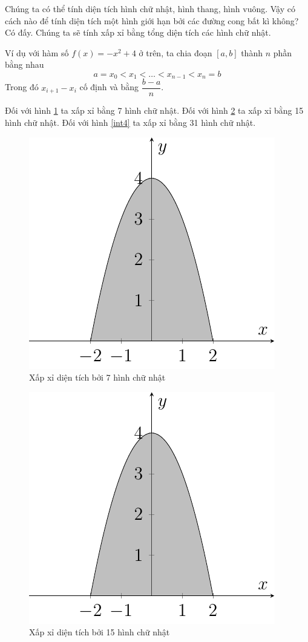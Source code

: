 Chúng ta có thể tính diện tích hình chữ nhật, hình thang, hình vuông. Vậy có cách nào để tính diện tích một hình giới hạn bởi các đường cong bất kì không? Có đấy. Chúng ta sẽ tính xấp xỉ bằng tổng diện tích các hình chữ nhật.

Ví dụ với hàm số $f(x) = -x^2 + 4$ ở trên, ta chia đoạn $[a, b]$ thành $n$ phần bằng nhau \[a = x_0 < x_1 < \ldots < x_{n-1} < x_n = b\]
Trong đó $x_{i+1} - x_i$ cố định và bằng $\dfrac{b-a}{n}$.

Đối với hình \ref{int2} ta xấp xỉ bằng 7 hình chữ nhật. Đối với hình \ref{int3} ta xấp xỉ bằng 15 hình chữ nhật. Đối với hình \ref{int4} ta xấp xỉ bằng 31 hình chữ nhật. 

\begin{figure}[htb]
	\centering
	\includegraphics[page=2]{analytic_geometry/riemann_sum.pdf}
	\caption{Xấp xỉ diện tích bởi 7 hình chữ nhật}
	\label{int2}
\end{figure}

\begin{figure}[htb]
	\centering
	\includegraphics[page=3]{analytic_geometry/riemann_sum.pdf}
	\caption{Xấp xỉ diện tích bởi 15 hình chữ nhật}
	\label{int3}
\end{figure}

